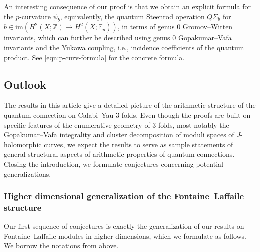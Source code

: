 \documentclass[reqno]{amsart}
\numberwithin{equation}{section}
\numberwithin{equation}{section}
\numberwithin{equation}{section}
\theoremstyle{definition}
\theoremstyle{remark}
\theoremstyle{remark}
\begin{document}
An interesting consequence of our proof is that we obtain an explicit formula for the $p$-curvature $\psi_b$, equivalently, the quantum Steenrod operation $Q\Sigma_b$ for $b \in \mathrm{im}(H^2(X;\mathbb{Z}) \to H^2(X;\mathbb{F}_p))$, in terms of genus $0$ Gromov--Witten invariants, which can further be described using genus $0$ Gopakumar--Vafa invariants and the Yukawa coupling, i.e., incidence coefficients of the quantum product. See \eqref{eqn:p-curv-formula} for the concrete formula. 

\subsection{Outlook}\label{sect:outlook}
The results in this article give a detailed picture of the arithmetic structure of the quantum connection on Calabi--Yau $3$-folds. Even though the proofs are built on specific features of the enumerative geometry of $3$-folds, most notably the Gopakumar--Vafa integrality and cluster decomposition of moduli spaces of $J$-holomorphic curves, we expect the results to serve as sample statements of general structural aspects of arithmetic properties of quantum connections. Closing the introduction, we formulate conjectures concerning potential generalizations.


\subsubsection{Higher dimensional generalization of the Fontaine--Laffaile structure}
Our first sequence of conjectures is exactly the generalization of our results on Fontaine--Laffaile modules in higher dimensions, which we formulate as follows. We borrow the notations from above.
\end{document}
